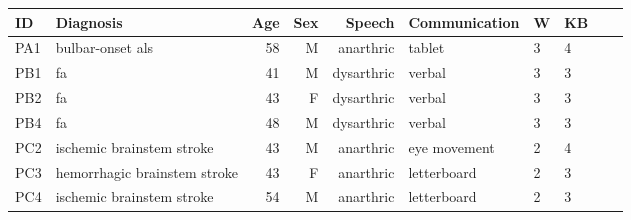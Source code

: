 \footnotesize
\begin{tabular}{@{}llrrrlllrr@{}}
	\toprule
	\textbf{ID}     & \textbf{Diagnosis}           & \textbf{Age} & \textbf{Sex} &
	\textbf{Speech} & \textbf{Communication}       &
	\textbf{W}      & \textbf{KB}                                                                                    \\ \midrule
	PA1             & bulbar-onset \acs{als}       & 58           & M            & anarthric  & tablet       & 3 & 4 \\
	PB1             & \acs{fa}                     & 41           & M            & dysarthric & verbal       & 3 & 3 \\
	PB2             & \acs{fa}                     & 43           & F            & dysarthric & verbal       & 3 & 3 \\
	PB4             & \acs{fa}                     & 48           & M            & dysarthric & verbal       & 3 & 3 \\
	PC2             & ischemic brainstem stroke    & 43           & M            & anarthric  & eye movement & 2 & 4 \\
	PC3             & hemorrhagic brainstem stroke & 43           & F            & anarthric  & letterboard  & 2 & 3 \\
	PC4             & ischemic brainstem stroke    & 54           & M            & anarthric  & letterboard  & 2 & 3 \\
	\bottomrule
\end{tabular}

